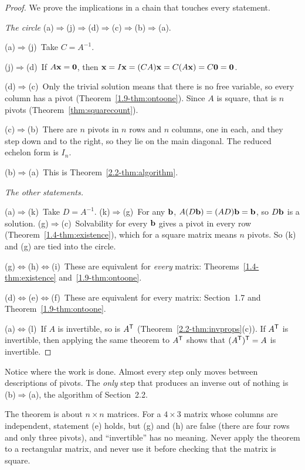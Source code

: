 \documentclass[11pt]{article}
\begin{document}
\begin{proof}
We prove the implications in a chain that touches every statement.

\emph{The circle} (a)$\Rightarrow$(j)$\Rightarrow$(d)$\Rightarrow$(c)$\Rightarrow$(b)$\Rightarrow$(a).

(a)$\Rightarrow$(j)~Take $C=A^{-1}$.

(j)$\Rightarrow$(d)~If $A\mathbf{x}=\mathbf{0}$, then $\mathbf{x}=I\mathbf{x}=(CA)\mathbf{x}=C(A\mathbf{x})=C\mathbf{0}=\mathbf{0}$.

(d)$\Rightarrow$(c)~Only the trivial solution means that there is no free variable, so every column has a pivot (Theorem~\ref{1.9-thm:ontoone}). Since $A$ is square, that is $n$ pivots (Theorem~\ref{thm:squarecount}).

(c)$\Rightarrow$(b)~There are $n$ pivots in $n$ rows and $n$ columns, one in each, and they step down and to the right, so they lie on the main diagonal. The reduced echelon form is $I_n$.

(b)$\Rightarrow$(a)~This is Theorem~\ref{2.2-thm:algorithm}.

\emph{The other statements.}

(a)$\Rightarrow$(k)~Take $D=A^{-1}$. (k)$\Rightarrow$(g)~For any $\mathbf{b}$, $A(D\mathbf{b})=(AD)\mathbf{b}=\mathbf{b}$, so $D\mathbf{b}$ is a solution. (g)$\Rightarrow$(c)~Solvability for every $\mathbf{b}$ gives a pivot in every row (Theorem~\ref{1.4-thm:existence}), which for a square matrix means $n$ pivots. So (k) and (g) are tied into the circle.

(g)$\Leftrightarrow$(h)$\Leftrightarrow$(i)~These are equivalent for \emph{every} matrix: Theorems~\ref{1.4-thm:existence} and~\ref{1.9-thm:ontoone}.

(d)$\Leftrightarrow$(e)$\Leftrightarrow$(f)~These are equivalent for every matrix: Section~1.7 and Theorem~\ref{1.9-thm:ontoone}.

(a)$\Leftrightarrow$(l)~If $A$ is invertible, so is $A^{\mathsf T}$ (Theorem~\ref{2.2-thm:invprops}(c)). If $A^{\mathsf T}$ is invertible, then applying the same theorem to $A^{\mathsf T}$ shows that $(A^{\mathsf T})^{\mathsf T}=A$ is invertible.
\end{proof}

Notice where the work is done. Almost every step only moves between descriptions of pivots. The \emph{only} step that produces an inverse out of nothing is (b)$\Rightarrow$(a), the algorithm of Section~2.2.

\begin{warn}
The theorem is about $n\times n$ matrices. For a $4\times3$ matrix whose columns are independent, statement (e) holds, but (g) and (h) are false (there are four rows and only three pivots), and ``invertible'' has no meaning. Never apply the theorem to a rectangular matrix, and never use it before checking that the matrix is square.
\end{warn}
\end{document}

